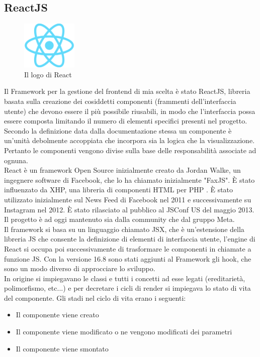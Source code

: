 \subsection{ReactJS}
\begin{figure}[h]
    \centering
    \includegraphics[width=100px]{./images/React.png}
    \caption{Il logo di React}
    \label{fig:React}
\end{figure}
Il Framework per la gestione del frontend di mia scelta è stato ReactJS, libreria basata sulla creazione dei cosiddetti componenti (frammenti dell'interfaccia utente) che devono essere il più possibile riusabili, in modo che l'interfaccia possa essere composta limitando il numero di elementi specifici presenti nel progetto. Secondo la definizione data dalla documentazione stessa un componente è un'unità debolmente accoppiata che incorpora sia la logica che la visualizzazione\cite{JSXDocs}. Pertanto le componenti vengono divise sulla base delle responsabilità associate ad ognuna.
\\
React è un framework Open Source inizialmente creato da Jordan Walke, un ingegnere software di Facebook, che lo ha chiamato inizialmente "FaxJS". È stato influenzato da XHP, una libreria di componenti HTML per PHP . È stato utilizzato inizialmente sul News Feed di Facebook nel 2011 e successivamente su Instagram nel 2012. È stato rilasciato al pubblico al JSConf US del maggio 2013.\cite{ReactHistory} Il progetto è ad oggi mantenuto sia dalla community che dal gruppo Meta.
\\
Il framework si basa su un linguaggio chiamato JSX, che è un'estensione della libreria JS che consente la definizione di elementi di interfaccia utente, l'engine di React si occupa poi successivamente di trasformare le componenti in chiamate a funzione JS\cite{JSXDocs}. Con la versione 16.8 sono stati aggiunti al Framework gli hook, che sono un modo diverso di approcciare lo sviluppo.
\\
In origine si impiegavano le classi e tutti i concetti ad esse legati (ereditarietà, polimorfismo, etc...) e per decretare i cicli di render si impiegava lo stato di vita del componente. Gli stadi nel ciclo di vita erano i seguenti:
\begin{itemize}
    \item Il componente viene creato
    \item Il componente viene modificato o ne vengono modificati dei parametri
    \item Il componente viene smontato
\end{itemize}
